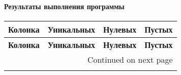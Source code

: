 \documentclass[12pt,a4paper]{article}
\begin{document}
  \paragraph*{Результаты выполнения программы}
  \begin{longtable}{l|rr|rr|rr}
    \toprule
    \textbf{Колонка} & \multicolumn{2}{l|}{\textbf{Уникальных}} & \multicolumn{2}{l|}{\textbf{Нулевых}} & \multicolumn{2}{l}{\textbf{Пустых}} \\
    \midrule
    \endfirsthead

    \toprule
    \textbf{Колонка} & \multicolumn{2}{l|}{\textbf{Уникальных}} & \multicolumn{2}{l|}{\textbf{Нулевых}} & \multicolumn{2}{l}{\textbf{Пустых}} \\
    \midrule
    \endhead
    \midrule
    \multicolumn{7}{r}{{Continued on next page}} \\
    \midrule
    \endfoot


\end{longtable}
\end{document}
